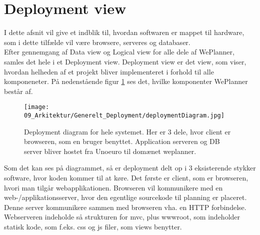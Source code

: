 \section{Deployment view}
I dette afsnit vil give et indblik til, hvordan softwaren er mappet til hardware, som i dette tilfælde vil være browsere, serveres og databaser. \\

\noindent Efter gennemgang af Data view og Logical view for alle dele af WePlanner, samles det hele i et Deployment view. Deployment view er det view, som viser, hvordan helheden af et projekt bliver implementeret i forhold til alle komponeneter. På nedenstående figur \ref{fig:ark_deploy_deploymentdiagram} ses det, hvilke komponenter WePlanner består af.

\begin{figure}[H]
  \texttt{[image: 09\_Arkitektur/Generelt\_Deployment/deploymentDiagram.jpg]}
  \centering
  \caption{Deployment diagram for hele systemet. Her er 3 dele, hvor client er browseren, som en bruger benyttet. Application serveren og DB server bliver hostet fra Unoeuro til domænet weplanner.}
  \label{fig:ark_deploy_deploymentdiagram}
\end{figure}

\noindent Som det kan ses på diagrammet, så er deployment delt op i 3 eksisterende stykker software, hvor koden kommer til at køre. Det første er client, som er browseren, hvori man tilgår webapplikationen. Browseren vil kommunikere med en web-/applikationsserver, hvor den egentlige sourcekode til planning er placeret. Denne server kommunikere sammen med browseren vha. en HTTP forbindelse. Webserveren indeholde så strukturen for mvc, plus wwwroot, som indeholder statisk kode, som f.eks. css og js filer, som views benytter. \\